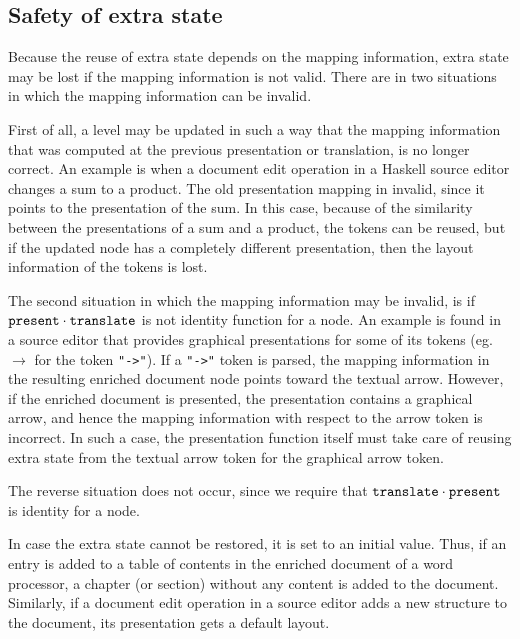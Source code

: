 %																
\subsection{Safety of extra state}

Because the reuse of extra state depends on the mapping information, extra state may be lost if the mapping information is not valid. There are in two situations in which the mapping information can be invalid.  

First of all, a level may be updated in such a way that the mapping information that was computed at the previous presentation or translation, is no longer correct. An example is when a document edit operation in a Haskell source editor changes a sum to a product. The old presentation mapping in invalid, since it points to the presentation of the sum. In this case, because of the similarity between the presentations of a sum and a product, the tokens can be reused, but if the updated node has a completely different presentation, then the layout information of the tokens is lost.

The second situation in which the mapping information may be invalid, is if ${\tt present} \cdot {\tt translate}$ is not identity function for a node.  An example is found in a source editor that provides graphical presentations for some of its tokens (eg. $\rightarrow$ for the token \verb|"->"|). If a \verb|"->"| token is parsed, the mapping information in the resulting enriched document node points toward the textual arrow. However, if the enriched document is presented, the presentation contains a graphical arrow, and hence the mapping information with respect to the arrow token is incorrect. In such a case, the presentation function itself must take care of reusing extra state from the textual arrow token for the graphical arrow token.

The reverse situation does not occur, since we require that ${\tt translate} \cdot {\tt present}$ is identity for a node. 

In case the extra state cannot be restored, it is set to an initial value. Thus, if an entry is added to a table of contents in the enriched document of a word processor, a chapter (or section) without any content is added to the document. Similarly, if a document edit operation in a source editor adds a new structure to the document, its presentation gets a default layout.

